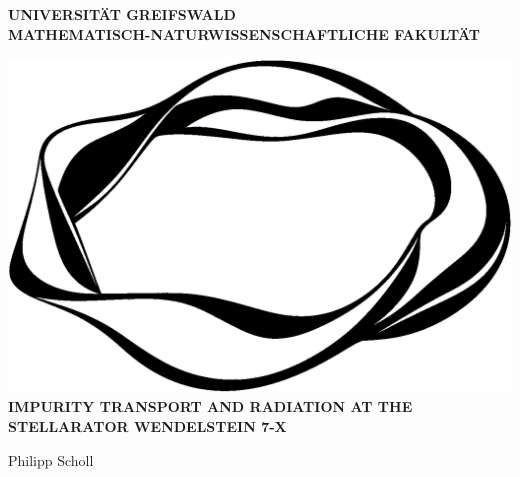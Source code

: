 \documentclass[12pt]{report}
\begin{document}
\begin{titlepage}
    \centering%

    \MakeUppercase{%
        \textbf{%
            Universität Greifswald\\[.3cm]%
        }%
    }%
    \MakeUppercase{%
        \textbf{%
            Mathematisch-Naturwissenschaftliche Fakultät\\%
        }%
    }%


    \vfill%
    \includegraphics[width=.4\textwidth]{spine_fs}\\[1cm]%

    \MakeUppercase{%
        \Large%
        \textbf{%
            Impurity Transport and Radiation at the Stellarator Wendelstein 7-X%
        }%
    }%
    \vspace*{3cm}%


    \vfill%
    {\Large%
        Philipp Scholl%
    }%

\end{titlepage}
\end{document}
